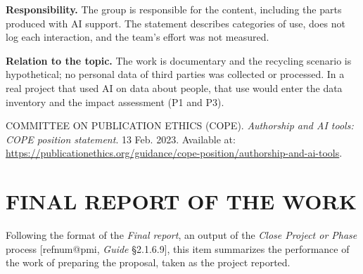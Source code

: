 \documentclass[12pt,a4paper,article,oneside,brazil,english]{abntex2}
\makeatletter
\newcommand{\refnum}[1]{\csname refnum@#1\endcsname}
\makeatother
\begin{document}
\textbf{Responsibility.} The group is responsible for the content, including the parts produced with AI support. The statement describes categories of use, does not log each interaction, and the team's effort was not measured.

\textbf{Relation to the topic.} The work is documentary and the recycling scenario is hypothetical; no personal data of third parties was collected or processed. In a real project that used AI on data about people, that use would enter the data inventory and the impact assessment (P1 and P3).

\begingroup\small\noindent COMMITTEE ON PUBLICATION ETHICS (COPE). \textit{Authorship and AI tools: COPE position statement}. 13 Feb. 2023. Available at: \url{https://publicationethics.org/guidance/cope-position/authorship-and-ai-tools}.\par\endgroup
\fi

\section{FINAL REPORT OF THE WORK}

Following the format of the \textit{Final report}, an output of the \textit{Close Project or Phase} process [\refnum{pmi}, \textit{Guide} §2.1.6.9], this item summarizes the performance of the work of preparing the proposal, taken as the project reported.
\end{document}
